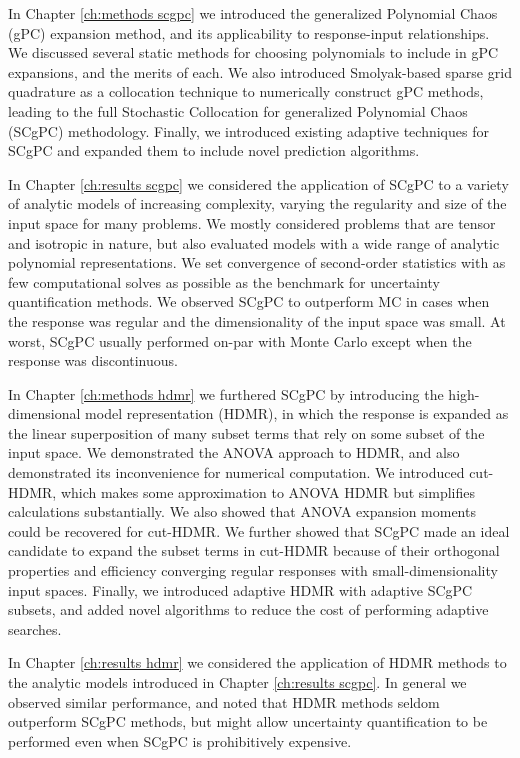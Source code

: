 In Chapter \ref{ch:methods scgpc} we introduced the generalized Polynomial Chaos (gPC) expansion method, and its
applicability to response-input relationships.  We discussed several static methods for choosing polynomials
to include in gPC expansions, and the merits of each.  We also introduced Smolyak-based sparse grid quadrature
as a collocation technique to numerically construct gPC methods, leading to the full Stochastic Collocation
for generalized Polynomial Chaos (SCgPC) methodology.
Finally, we introduced existing adaptive techniques for SCgPC and expanded them to include novel prediction
algorithms.

In Chapter \ref{ch:results scgpc} we considered the application of SCgPC to a variety of analytic models of
increasing complexity, varying the regularity and size of the input space for many problems.  We mostly
considered problems that are tensor and isotropic in nature, but also evaluated models with a wide range of
analytic polynomial representations.  We set convergence of second-order statistics with as few computational
solves as possible as the benchmark for uncertainty quantification methods.  We observed SCgPC to outperform
MC in cases when the response was regular and the dimensionality of the input space was small.  At worst,
SCgPC usually performed on-par with Monte Carlo except when the response was discontinuous.

In Chapter \ref{ch:methods hdmr} we furthered SCgPC by introducing the high-dimensional model representation
(HDMR),
in which the response is expanded as the linear superposition of many subset terms that rely on some subset of
the input space.  We demonstrated the ANOVA approach to HDMR, and also demonstrated its inconvenience for
numerical computation.  We introduced cut-HDMR, which makes some approximation to ANOVA HDMR but simplifies
calculations substantially.  We also showed that ANOVA expansion moments could be recovered for cut-HDMR.  We
further showed that SCgPC made an ideal candidate to expand the subset terms in cut-HDMR because of their
orthogonal properties and efficiency converging regular responses with small-dimensionality input spaces.
Finally, we introduced adaptive HDMR with adaptive SCgPC subsets, and added novel algorithms to reduce the
cost of performing adaptive searches.

In Chapter \ref{ch:results hdmr} we considered the application of HDMR methods to the analytic models
introduced in Chapter \ref{ch:results scgpc}.  In general we observed similar performance, and noted that HDMR
methods seldom outperform SCgPC methods, but might allow uncertainty quantification to be performed even when
SCgPC is prohibitively expensive.


